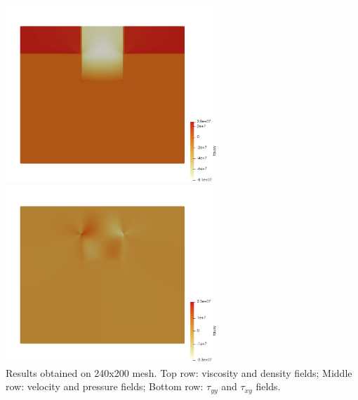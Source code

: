 \begin{center}
\includegraphics[width=8cm]{python_codes/fieldstone_160/results/tau_yy.png}
\includegraphics[width=8cm]{python_codes/fieldstone_160/results/tau_xy.png}\\
{\captionfont Results obtained on 240x200 mesh. Top row: viscosity and density fields;
Middle row: velocity and pressure fields; 
Bottom row: $\tau_{yy}$ and $\tau_{xy}$ fields.}
\end{center}



